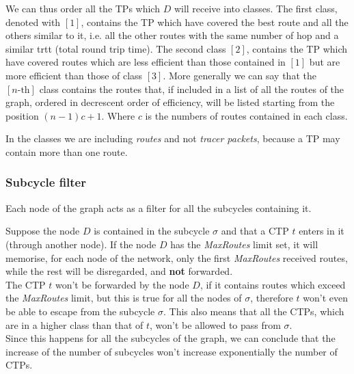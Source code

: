 \documentclass[a4paper]{article}
\begin{document}
We can thus order all the TPs which $D$ will receive into classes. The first
class, denoted with $[1]$, contains the TP which have covered the best
route and all the others similar to it, i.e. all the other routes with the same
number of hop and a similar trtt (total round trip time).
The second class $[2]$, contains the TP which have covered routes which are
less efficient than those contained in $[1]$ but are more efficient than those
of class $[3]$.
More generally we can say that the $[n\textrm{-th}]$ class contains the routes that,
if included in a list of all the routes of the graph, ordered in decrescent
order of efficiency, will be listed starting from the position $(n-1)c+1$. Where
$c$ is the numbers of routes contained in each class.

In the classes we are including \emph{routes} and not \emph{tracer packets},
because a TP may contain more than one route.

\subsubsection{Subcycle filter}
Each node of the graph acts as a filter for all the subcycles containing it.

Suppose the node $D$ is contained in the subcycle $\sigma$ and that a CTP $t$
enters in it (through another node).
If the node $D$ has the \emph{MaxRoutes} limit set, it will memorise, for each
node of the network, only the first \emph{MaxRoutes} received routes, while the
rest will be disregarded, and \textbf{not} forwarded. \\
The CTP $t$ won't be forwarded by the node $D$, if it contains routes which
exceed the \emph{MaxRoutes} limit, but this is true for all the nodes of
$\sigma$, therefore $t$ won't even be able to escape from the subcycle
$\sigma$. This also means that all the CTPs, which are in a higher
class than that of $t$, won't be allowed to pass from $\sigma$.\\

Since this happens for all the subcycles of the graph, we can conclude that
the increase of the number of subcycles won't increase exponentially the
number of CTPs.
\end{document}
